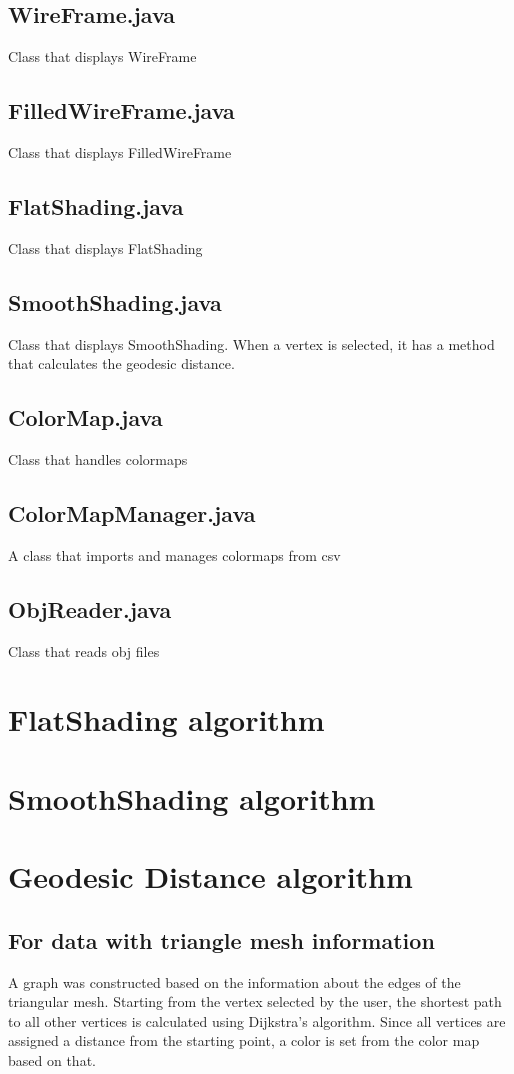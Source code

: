 \documentclass[12pt]{article}
\begin{document}
\subsection{WireFrame.java}
Class that displays WireFrame
\subsection{FilledWireFrame.java}
Class that displays FilledWireFrame
\subsection{FlatShading.java}
Class that displays FlatShading
\subsection{SmoothShading.java}
Class that displays SmoothShading. When a vertex is selected, it has a method
that calculates the geodesic distance.
\subsection{ColorMap.java}
Class that handles colormaps
\subsection{ColorMapManager.java}
A class that imports and manages colormaps from csv
\subsection{ObjReader.java}
Class that reads obj files

\section{FlatShading algorithm}

\section{SmoothShading algorithm}

\section{Geodesic Distance algorithm}

\subsection{For data with triangle mesh information}
A graph was constructed based on the information about the edges of the
triangular mesh. Starting from the vertex selected by the user, the shortest
path to all other vertices is calculated using Dijkstra's algorithm. Since all
vertices are assigned a distance from the starting point, a color is set from
the color map based on that.
\end{document}
